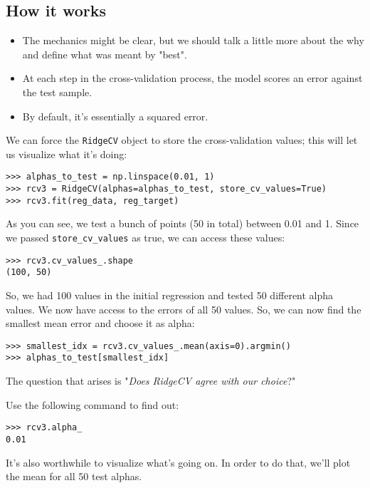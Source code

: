\documentclass[SKL-MASTER.tex]{subfiles}
\begin{document}
\subsection*{How it works}
\begin{itemize}
\item The mechanics might be clear, but we should talk a little more about the why and define what
was meant by "best". 
\item  At each step in the cross-validation process, the model scores an error
against the test sample. 
\item By default, it's essentially a squared error. 

\end{itemize}
We can force the \texttt{RidgeCV} object to store the cross-validation values; this will let us visualize
what it's doing:
\begin{framed}
\begin{verbatim}
>>> alphas_to_test = np.linspace(0.01, 1)
>>> rcv3 = RidgeCV(alphas=alphas_to_test, store_cv_values=True)
>>> rcv3.fit(reg_data, reg_target)
\end{verbatim}
\end{framed}

As you can see, we test a bunch of points (50 in total) between 0.01 and 1. Since we passed
\texttt{store\_cv\_values} as true, we can access these values:
\begin{framed}
	\begin{verbatim}
>>> rcv3.cv_values_.shape
(100, 50)
\end{verbatim}
\end{framed}

So, we had 100 values in the initial regression and tested 50 different alpha values. We now
have access to the errors of all 50 values. So, we can now find the smallest mean error and
choose it as alpha:
\begin{framed}
	\begin{verbatim}
>>> smallest_idx = rcv3.cv_values_.mean(axis=0).argmin()
>>> alphas_to_test[smallest_idx]
\end{verbatim}
\end{framed}

The question that arises is "\textit{Does RidgeCV agree with our choice}?" 

Use the following command
to find out:
\begin{framed}
	\begin{verbatim}
>>> rcv3.alpha_
0.01
\end{verbatim}
\end{framed}
It's also worthwhile to visualize what's going on. In order to do that, we'll plot the mean for all
50 test alphas.
\end{document}
